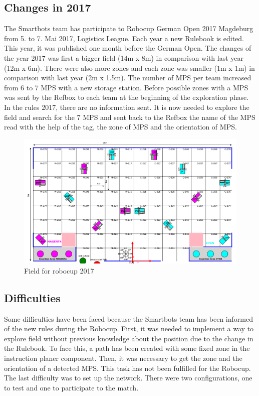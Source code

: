 \subsection{Changes in 2017}

The Smartbots team has participate to Robocup German Open 2017 Magdeburg from 5. to 7. Mai 2017, Logistics League. Each year a new Rulebook is edited. This year, it was published one month before the German Open. The changes of the year 2017 was first a bigger field (14m x 8m) in comparison with last year (12m x 6m). There were also more zones and each zone was smaller (1m x 1m) in comparison with last year (2m x 1.5m). The number of MPS per team increased from 6 to 7 MPS with a new storage station. Before possible zones with a MPS was sent by the Refbox to each team at the beginning of the exploration phase. In the rules 2017, there are no information sent. It is now needed to explore the field and search for the 7 MPS and sent back to the Refbox the name of the MPS read with the help of the tag, the zone of MPS and the orientation of MPS. 

\begin{figure}%
\centering
\includegraphics[width=\linewidth]{pic/field.png}
\caption{Field for robocup 2017}
\label{fig:frog}
\end{figure}

\subsection{Difficulties}

Some difficulties have been faced because the Smartbots team has been informed of the new rules during the Robocup. First, it was needed to implement a way to explore field without previous knowledge about the position due to the change in the Rulebook. To face this, a path has been created with some fixed zone in the instruction planer component.  Then, it was necessary to get the zone and the orientation of a detected MPS. This task has not been fulfilled for the Robocup. The last difficulty was to set up the network. There were two configurations, one to test and one to participate to the match.
 


